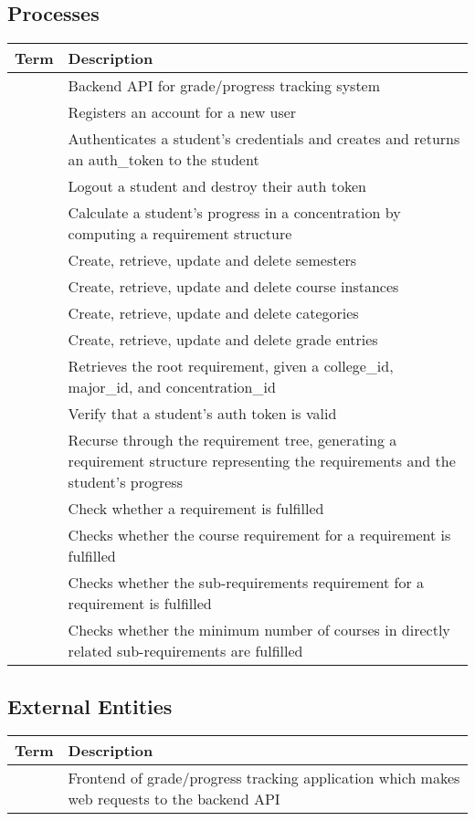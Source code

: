 \documentclass[12pt]{article}
\newenvironment{dictionary}[1]
{
    \subsection{#1}
    \begin{table}[H]
    \begin{tabular}{ | m{\dimexpr.45\linewidth-1\tabcolsep-1.3333\arrayrulewidth}
                     | m{\dimexpr.55\linewidth-1\tabcolsep-1.3333\arrayrulewidth} | }
    \hline
    \textbf{Term} & \textbf{Description} \\ \hline
}
{
    \end{tabular}
    \end{table}
}
\newcommand{\dictitem}[2]{\detokenize{#1} & #2 \\ \hline}
\begin{document}
\begin{dictionary}{Processes}
    \dictitem{Grade/Progress Tracking System}{Backend API for grade/progress tracking system}
    \dictitem{Register User}{Registers an account for a new user}
    \dictitem{Authenticate Student}{Authenticates a student's credentials and creates and returns an
    auth\_token to the student}
    \dictitem{Logout Student}{Logout a student and destroy their auth token}
    \dictitem{Calculate Concentration Progress}{Calculate a student's progress in a concentration
    by computing a requirement structure}
    \dictitem{Manage Semesters}{Create, retrieve, update and delete semesters}
    \dictitem{Manage Courses}{Create, retrieve, update and delete course instances}
    \dictitem{Manage Categories}{Create, retrieve, update and delete categories}
    \dictitem{Manage Grade Entries}{Create, retrieve, update and delete grade entries}
    \dictitem{Retrieve Requirement}{Retrieves the root requirement, given a college\_id, major\_id,
    and concentration\_id}
    \dictitem{Authenticate Student}{Verify that a student's auth token is valid}
    \dictitem{Generate Requirement Structure}{Recurse through the requirement tree, generating a
    requirement structure representing the requirements and the student's progress}
    \dictitem{Check Fulfillment}{Check whether a requirement is fulfilled}
    \dictitem{Check Course Requirements}{Checks whether the course requirement for a requirement
    is fulfilled}
    \dictitem{Check Sub-Requirements}{Checks whether the sub-requirements requirement for a
    requirement is fulfilled}
    \dictitem{Check Sub-requirement Course Count}{Checks whether the minimum number of courses in
    directly related sub-requirements are fulfilled}
\end{dictionary}


\begin{dictionary}{External Entities}
    \dictitem{System Frontend}{Frontend of grade/progress tracking application which makes web
    requests to the backend API}
\end{dictionary}
\end{document}
